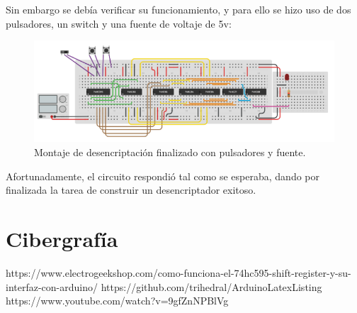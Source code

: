 \documentclass{article}
\begin{document}
\newpage
Sin embargo se debía verificar su funcionamiento, y para ello se hizo uso de dos pulsadores, un switch y una fuente de voltaje de 5v:
\begin{figure}[h]
\includegraphics[scale=0.7]{desencriptacion pulsadores.png}
\centering
\caption{Montaje de desencriptación finalizado con pulsadores y fuente.}
\label{fig:desencriptación3}
\end{figure}
\newline
Afortunadamente, el circuito respondió tal como se esperaba, dando por finalizada la tarea de construir un desencriptador exitoso.


\newpage
\section{Cibergrafía} \label{ciber}

https://www.electrogeekshop.com/como-funciona-el-74hc595-shift-register-y-su-interfaz-con-arduino/
\newline
https://github.com/trihedral/ArduinoLatexListing
\newline
https://www.youtube.com/watch?v=9gfZnNPBlVg
\end{document}
